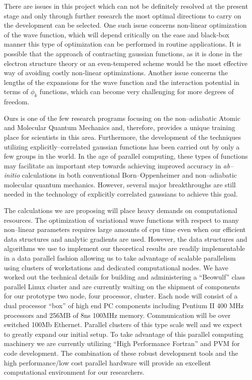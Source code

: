 There are issues in this project which can not be definitely
resolved at the present stage and only through further research 
the most optimal directions to carry on the development can be
selected. One such issue concerns non-linear optimization of the
wave function, which will depend critically on the ease and black-box
manner this type of optimization can be performed in routine applications.
It is possible that the approach of contracting gaussian functions,
as it is done in the electron structure theory 
or an even-tempered scheme 
would be the most
effective way of avoiding costly non-linear optimizations.
Another issue concerns the lengths of the expansions for the
wave function and the interaction potential in terms of $\phi_k$
functions, which can become very challenging for more degrees
of freedom.



Ours is one of the few research 
programs focusing on the non--adiabatic 
Atomic and Molecular Quantum Mechanics
and, therefore, provides a unique 
training place for scientists in this area.  
Furthermore, the development of the techniques 
utilizing explicitly--correlated gaussian functions
has been carried out by only a few groups in the world.  
In the age of parallel computing, these
types of functions may facilitate an important 
step towards achieving improved accuracy in 
{\it ab--initio} calculations in both conventional 
Born--Oppenheimer and non--adiabatic 
molecular quantum mechanics.
However, several major breakthroughs are still needed 
in the technology of explicitly correlated gaussians
to achieve this goal.

The calculations we are proposing will place heavy demands on computational
resources. The optimization of variational wave functions with
respect to many non--linear parameters requires large amounts of
cpu time even when our efficient data structures and analytic gradients
are used. However, the data structures and algorithms we use to implement
our theoretical results are readily implementable in a data parallel fashion
allowing us to take advantage of scalable  parallelism using clusters
of workstations and dedicated computational nodes. We have worked out
the technical details for building and administering
a ``Beowulf''\cite{beowulfwww} class
parallel Linux cluster and are currently waiting on the shipment of
components for our prototype two node, four processor, cluster. Each node
will consist of a dual processor ``box'' of high end 
PC components including Pentium II 400 MHz processors and 
256MB of 8ns 100MHz memory. Communication will be over 
switched 100Mb Ethernet. Parallel clusters of this type
scale well and we expect to greatly expand our initial setup.
To take advantage of this parallel computing machinery we are  currently
utilizing ``High Performance Fortran'' \cite{HPFwww,PGIhpfwww}
and PVM \cite{PVMwww} for code development. The combination of these
robust development tools and the high performance/low cost parallel hardware
will provide an excellent computational environment for our researchers.     

